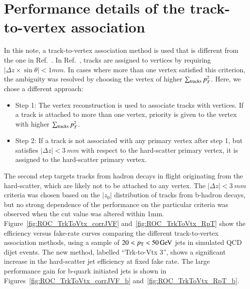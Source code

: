\section{Performance details of the track-to-vertex association}
\label{sec:Appendix_TrackVertex}
In this note, a track-to-vertex association method is used that is different from the one
in Ref.~\cite{ATLASConfNote:PUcorrection}. In Ref.~\cite{ATLASConfNote:PUcorrection},
tracks are assigned to vertices by requiring $|\Delta z \times \sin\theta| < 1 \unit{mm}$. 
In cases where more than one vertex satisfied this
criterion, the ambiguity was resolved by choosing the vertex of higher $\sum_{\rm tracks}{p_T^2}$. Here, 
we chose a different approach:
\begin{itemize}
    \item Step 1: The vertex reconstruction is used to associate tracks with vertices. If a track is attached to more than one vertex, priority is given to the vertex with higher $\sum_{\rm tracks}{p_T^2}$. 
    \item Step 2: If a track is not associated with any primary vertex after step 1, but satisfies $|\Delta z|<3~\unit{mm}$ with respect to the hard-scatter primary vertex, it is assigned to the hard-scatter primary vertex. 
\end{itemize}
The second step targets tracks from hadron decays in flight originating from the hard-scatter, which are likely not to be attached to any vertex. 
The $|\Delta z|<3~\unit{mm}$ criteria was chosen based on the $|z_0|$ distribution of tracks from b-hadron decays, but no strong dependence of the performance on the particular criteria was observed when the 
cut value was altered within 1\unit{mm}.
Figure~\ref{fig:ROC_TrkToVtx_corrJVF} and~\ref{fig:ROC_TrkToVtx_RpT} show the efficiency versus fake-rate curves comparing the different track-to-vertex association methods, using a
sample of $20< p_{\mathrm{T}} < 50\,\text{Ge\hspace{-.08em}V}$ jets in simulated QCD dijet events. The new method, labelled ``Trk-to-Vtx 3'', shows a significant increase in the hard-scatter jet efficiency at fixed fake rate. 
The large performance gain for b-quark initiated jets is shown in Figures~\ref{fig:ROC_TrkToVtx_corrJVF_b} and~\ref{fig:ROC_TrkToVtx_RpT_b}. 
